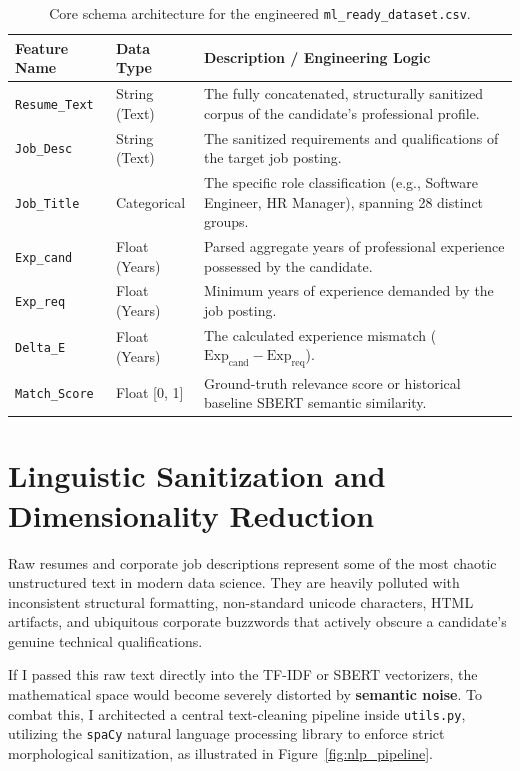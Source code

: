 \begin{table}[htbp]
\centering
\caption{Core schema architecture for the engineered \texttt{ml\_ready\_dataset.csv}.}
\label{tab:dataset_schema}
\small
\renewcommand{\arraystretch}{1.5} %
\begin{tabular}{@{}>{\raggedright\arraybackslash}p{3.0cm}>{\raggedright\arraybackslash}p{2.5cm}>{\raggedright\arraybackslash}p{8.5cm}@{}}
\toprule
\textbf{Feature Name} & \textbf{Data Type} & \textbf{Description / Engineering Logic} \\
\midrule
\texttt{Resume\_Text} & String (Text) & The fully concatenated, structurally sanitized corpus of the candidate's professional profile. \\
\texttt{Job\_Desc} & String (Text) & The sanitized requirements and qualifications of the target job posting. \\
\texttt{Job\_Title} & Categorical & The specific role classification (e.g., Software Engineer, HR Manager), spanning 28 distinct groups. \\
\texttt{Exp\_cand} & Float (Years) & Parsed aggregate years of professional experience possessed by the candidate. \\
\texttt{Exp\_req} & Float (Years) & Minimum years of experience demanded by the job posting. \\
\texttt{Delta\_E} & Float (Years) & The calculated experience mismatch ($\text{Exp}_{\text{cand}} - \text{Exp}_{\text{req}}$). \\
\texttt{Match\_Score} & Float [0, 1] & Ground-truth relevance score or historical baseline SBERT semantic similarity. \\
\bottomrule
\end{tabular}
\end{table}

\section{Linguistic Sanitization and Dimensionality Reduction}
\label{sec:text_cleaning}

Raw resumes and corporate job descriptions represent some of the most chaotic unstructured text in modern data science. They are heavily polluted with inconsistent structural formatting, non-standard unicode characters, HTML artifacts, and ubiquitous corporate buzzwords that actively obscure a candidate's genuine technical qualifications.

If I passed this raw text directly into the TF-IDF or SBERT vectorizers, the mathematical space would become severely distorted by \textbf{semantic noise}. To combat this, I architected a central text-cleaning pipeline inside \texttt{utils.py}, utilizing the \texttt{spaCy} natural language processing library to enforce strict morphological sanitization, as illustrated in Figure~\ref{fig:nlp_pipeline}.

